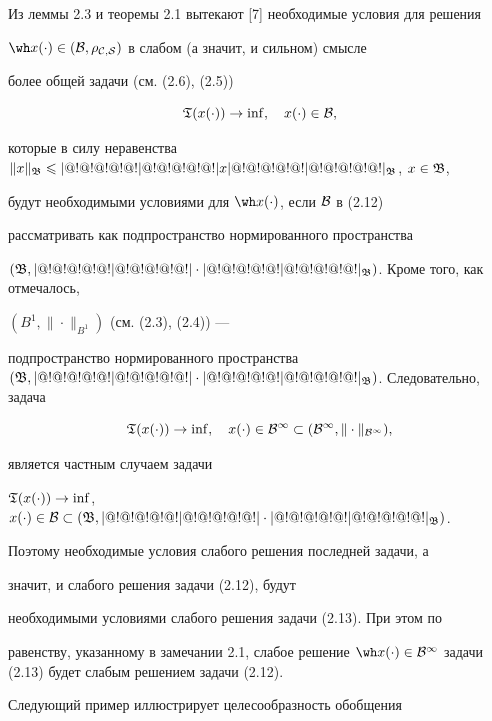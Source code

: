 Из леммы 2.3 и теоремы 2.1 вытекают [7] необходимые условия для решения


$\wh x(\cdot)\in(\cal B,\rho_{C,S})$ в слабом (а значит, и сильном) смысле


более общей задачи (см. (2.6), (2.5))


\begin{equation}


\frak T(x(\cdot))\to\inf,\quad x(\cdot)\in\cal B,


\end{equation}


которые в силу неравенства $\|x\|_{\frak B}\leqslant


\tri x\tri_{\frak B}$, $x\in\frak B$,


будут необходимыми условиями для $\wh x(\cdot)$, если $\cal B$ в (2.12)


рассматривать как подпространство нормированного пространства


$(\frak B,|@!@!@!@!@!|@!@!@!@!@!|\cdot|@!@!@!@!@!|@!@!@!@!@!|_{\frak B})$. Кроме того, как отмечалось,


$(B^1,\|\cdot\|_{B^1})$ (см. (2.3), (2.4)) ---


подпространство нормированного пространства $(\frak B,


\tri\cdot\tri_{\frak B})$. Следовательно, задача


\begin{equation}


\frak T(x(\cdot))\to \inf,\quad x(\cdot)\in\cal


B^1\subset(B^1,\|\cdot\|_{B^1}),


\end{equation}


является частным случаем задачи


$\frak T(x(\cdot))\to \inf$, $x(\cdot)\in\cal B\subset


(\frak B,\tri\cdot\tri_{\frak B})$.


Поэтому необходимые условия слабого решения последней задачи, а


значит, и слабого решения задачи (2.12), будут


необходимыми условиями слабого решения задачи (2.13). При этом по


равенству, указанному в замечании 2.1, слабое решение $\wh


x(\cdot)\in\cal B^1$ задачи (2.13) будет слабым решением задачи (2.12).





Следующий пример иллюстрирует целесообразность обобщения


